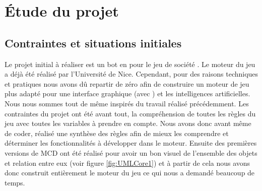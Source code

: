 \section{Étude du projet}
\subsection{Contraintes et situations initiales}
Le projet initial à réaliser est un bot en \java pour le jeu de société \himalaya. Le moteur du jeu a déjà été réalisé par l'Université de Nice. Cependant, pour des raisons techniques et pratiques nous avons dû repartir de zéro afin de construire un moteur de jeu plus adapté pour une interface graphique (avec \fx) et les intelligences artificielles. Nous nous sommes tout de même inspirés du travail réalisé précédemment. 
Les contraintes du projet ont été avant tout, la compréhension de toutes les règles du jeu avec toutes les variables à prendre en compte. Nous avons donc avant même de coder, réalisé une synthèse des règles afin de mieux les comprendre et déterminer les fonctionnalités à développer dans le moteur. Ensuite des premières versions de MCD ont été réalisé pour avoir un bon visuel de l'ensemble des objets et relation entre eux (voir figure \ref{fig:UMLCore1}) et à partir de cela nous avons donc construit entièrement le moteur du jeu ce qui nous a demandé beaucoup de temps.

